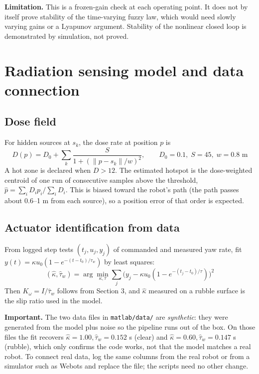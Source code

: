 \documentclass[11pt,a4paper]{article}
\begin{document}
\textbf{Limitation.} This is a frozen-gain check at each operating point. It does not by itself prove stability of the time-varying fuzzy law, which would need slowly varying gains or a Lyapunov argument. Stability of the nonlinear closed loop is demonstrated by simulation, not proved.

\section{Radiation sensing model and data connection}
\subsection{Dose field}
For hidden sources at $s_k$, the dose rate at position $p$ is
\begin{equation}
D(p)=D_0+\sum_k\frac{S}{1+(\|p-s_k\|/w)^2},\qquad D_0=0.1,\;S=45,\;w=0.8\text{ m}
\end{equation}
A hot zone is declared when $D>12$. The estimated hotspot is the dose-weighted centroid of one run of consecutive samples above the threshold, $\hat p=\sum_i D_i p_i/\sum_i D_i$. This is biased toward the robot's path (the path passes about 0.6--1 m from each source), so a position error of that order is expected.

\subsection{Actuator identification from data}
From logged step tests $(t_j,u_j,y_j)$ of commanded and measured yaw rate, fit $y(t)=\kappa u_0(1-e^{-(t-t_0)/\tau_w})$ by least squares:
\begin{equation}
(\hat\kappa,\hat\tau_w)=\arg\min_{\kappa,\tau}\sum_j\big(y_j-\kappa u_0(1-e^{-(t_j-t_0)/\tau})\big)^2
\end{equation}
Then $K_\omega=I/\hat\tau_w$ follows from Section 3, and $\hat\kappa$ measured on a rubble surface is the slip ratio used in the model.

\textbf{Important.} The two data files in \texttt{matlab/data/} are \emph{synthetic}: they were generated from the model plus noise so the pipeline runs out of the box. On those files the fit recovers $\hat\kappa=1.00,\hat\tau_w=0.152$ s (clear) and $\hat\kappa=0.60,\hat\tau_w=0.147$ s (rubble), which only confirms the code works, not that the model matches a real robot. To connect real data, log the same columns from the real robot or from a simulator such as Webots and replace the file; the scripts need no other change.
\end{document}
